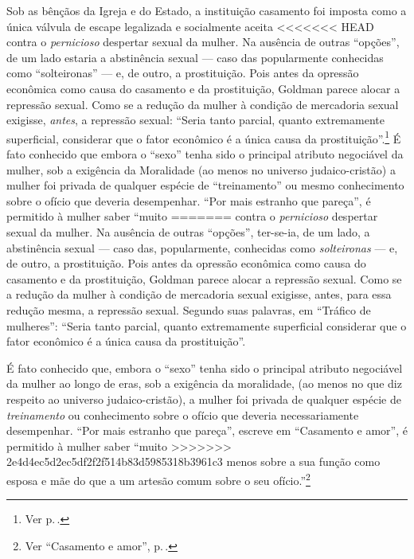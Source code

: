 {Sob as bênçãos da Igreja e do Estado, a instituição casamento foi
imposta como a única válvula de escape legalizada e socialmente aceita
<<<<<<< HEAD
contra o \emph{pernicioso} despertar sexual da mulher. Na ausência de
outras ``opções'', de um lado estaria a abstinência sexual --- caso
das popularmente conhecidas como ``solteironas'' --- e, de outro, a
prostituição. Pois antes da opressão econômica como causa do casamento e
da prostituição, Goldman parece alocar a repressão sexual. Como se a
redução da mulher à condição de mercadoria sexual exigisse,
\emph{antes}, a repressão sexual: ``Seria tanto parcial, quanto
extremamente superficial, considerar que o fator econômico é a única
causa da prostituição''.\footnote{Ver p.\,\pageref{parcial}.}
É fato conhecido que embora o ``sexo'' tenha
sido o principal atributo negociável da mulher, sob a
exigência da Moralidade (ao menos no universo
judaico-cristão) a mulher foi privada de qualquer espécie de
``treinamento'' ou mesmo conhecimento sobre o ofício que
deveria desempenhar. ``Por mais estranho que pareça'',
é permitido à mulher saber ``muito
=======
contra o \textit{pernicioso} despertar sexual da mulher. Na ausência de
outras ``opções'', ter-se-ia, de um lado, a abstinência sexual --- caso
das, popularmente, conhecidas como \textit{solteironas} --- e, de outro, a
prostituição. Pois antes da opressão econômica como causa do casamento e
da prostituição, Goldman parece alocar a repressão sexual. Como se a
redução da mulher à condição de mercadoria sexual exigisse,
antes, para essa redução mesma, a repressão sexual. Segundo suas
palavras, em ``Tráfico de mulheres'': ``Seria tanto parcial, quanto
extremamente superficial considerar que o fator econômico é a única
causa da prostituição''. 

É fato conhecido que, embora o ``sexo'' tenha
sido o principal atributo negociável da mulher ao longo de eras, sob a
exigência da moralidade, (ao menos no que diz respeito ao universo
judaico-cristão), a mulher foi privada de qualquer espécie de
\textit{treinamento} ou conhecimento sobre o ofício que
deveria necessariamente desempenhar. ``Por mais estranho que pareça'',
escreve em ``Casamento e amor'', é permitido à mulher saber ``muito
>>>>>>> 2e4d4ec5d2ec5df2f2f514b83d5985318b3961c3
menos sobre a sua função como esposa e mãe do que a um artesão comum
sobre o seu ofício.''\footnote{Ver ``Casamento e amor'', p.\,\pageref{artesao}.}

}
